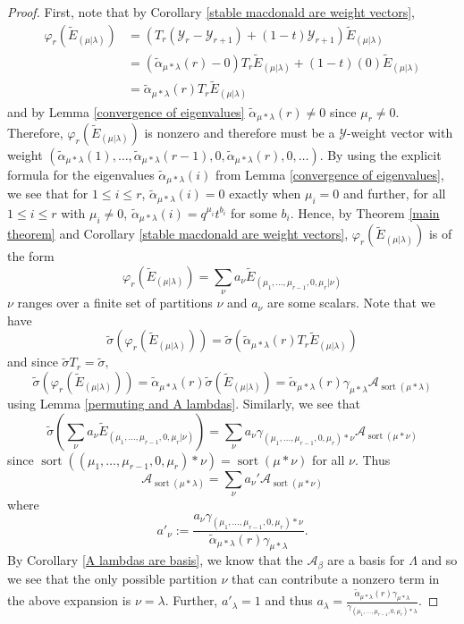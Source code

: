 \documentclass[ALCO,Unicode]{cedram}
\newcommand{\y}{{ \mathscr{Y} }}
\DeclareMathOperator{\sort}{sort}
\begin{document}
\begin{proof}
First, note that by Corollary \ref{stable macdonald are weight vectors},
\begin{align*}
    \varphi_r(\widetilde{E}_{(\mu|\lambda)}) &= (T_r(\y_r-\y_{r+1})+(1-t)\y_{r+1})\widetilde{E}_{(\mu|\lambda)} \\
    &= (\widetilde{\alpha}_{\mu*\lambda}(r)-0)T_r\widetilde{E}_{(\mu|\lambda)} + (1-t)(0)\widetilde{E}_{(\mu|\lambda)}\\
    &= \widetilde{\alpha}_{\mu*\lambda}(r)T_r\widetilde{E}_{(\mu|\lambda)}
\end{align*}
and by Lemma \ref{convergence of eigenvalues} $\widetilde{\alpha}_{\mu*\lambda}(r) \neq 0$ since $\mu_r \neq 0$. Therefore, $\varphi_r(\widetilde{E}_{(\mu|\lambda)})$ is nonzero and therefore must be a $\y$-weight vector with weight $(\widetilde{\alpha}_{\mu*\lambda}(1),\ldots,\widetilde{\alpha}_{\mu*\lambda}(r-1),0,\widetilde{\alpha}_{\mu*\lambda}(r), 0,\ldots)$. By using the explicit formula for the eigenvalues $\widetilde{\alpha}_{\mu*\lambda}(i)$ from Lemma \ref{convergence of eigenvalues}, we see that for $1 \leq i \leq r$, $\widetilde{\alpha}_{\mu*\lambda}(i) = 0$ exactly when $\mu_i = 0$ and further, for all $1 \leq i \leq r$ with $\mu_i \neq 0$, $\widetilde{\alpha}_{\mu*\lambda}(i) = q^{\mu_i}t^{b_i}$ for some $b_i$. Hence, by Theorem \ref{main theorem} and Corollary \ref{stable macdonald are weight vectors}, $\varphi_r(\widetilde{E}_{(\mu|\lambda)})$ is of the form 
$$\varphi_r(\widetilde{E}_{(\mu|\lambda)}) = \sum_{\nu} a_{\nu} \widetilde{E}_{(\mu_1,\ldots,\mu_{r-1},0,\mu_r|\nu)}$$
$\nu$ ranges over a finite set of partitions $\nu$ and $a_{\nu}$ are some scalars. 
Note that we have 
$$\widetilde{\sigma}(\varphi_r(\widetilde{E}_{(\mu|\lambda)})) =  \widetilde{\sigma}(\widetilde{\alpha}_{\mu*\lambda}(r)T_r\widetilde{E}_{(\mu|\lambda)}) $$ and since $\widetilde{\sigma}T_r = \widetilde{\sigma},$ $$\widetilde{\sigma}(\varphi_r(\widetilde{E}_{(\mu|\lambda)}))= \widetilde{\alpha}_{\mu*\lambda}(r)\widetilde{\sigma}(\widetilde{E}_{(\mu|\lambda)}) = \widetilde{\alpha}_{\mu*\lambda}(r) \gamma_{\mu*\lambda} \mathcal{A}_{\sort(\mu*\lambda)}$$ 
using Lemma \ref{permuting and A lambdas}. 
Similarly, we see that 
$$\widetilde{\sigma}\left( \sum_{\nu} a_{\nu} \widetilde{E}_{(\mu_1,\ldots,\mu_{r-1},0,\mu_r|\nu)}   \right) = \sum_{\nu} a_{\nu} \gamma_{(\mu_1,\ldots,\mu_{r-1},0,\mu_r)*\nu} \mathcal{A}_{\sort(\mu*\nu)}$$
since $\sort((\mu_1,\ldots,\mu_{r-1},0,\mu_r)*\nu) = \sort(\mu*\nu)$ for all $\nu.$ Thus
$$\mathcal{A}_{\sort(\mu*\lambda)} = \sum_{\nu} a_{\nu}' \mathcal{A}_{\sort(\mu*\nu)} $$
where $$a'_{\nu}:= \frac{a_{\nu}\gamma_{(\mu_1,\ldots,\mu_{r-1},0,\mu_r)*\nu}}{\widetilde{\alpha}_{\mu*\lambda}(r)\gamma_{\mu*\lambda}}.$$ By Corollary \ref{A lambdas are basis}, we know that the $\mathcal{A}_{\beta}$ are a basis for $\Lambda$ and so we see that the only possible partition $\nu$ that can contribute a nonzero term in the above expansion is $\nu = \lambda$. Further, $a'_{\lambda} = 1$ and thus $a_{\lambda} = \frac{\widetilde{\alpha}_{\mu*\lambda}(r)\gamma_{\mu*\lambda}}{\gamma_{(\mu_1,\ldots,\mu_{r-1},0,\mu_r)*\lambda}}.$


\end{proof}
\end{document}
